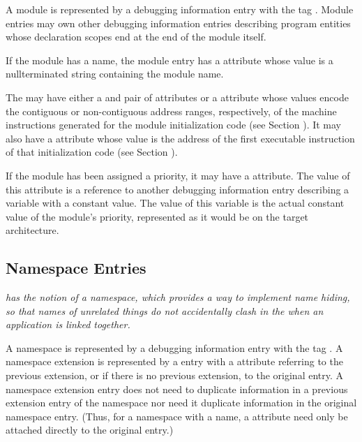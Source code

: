 A module is represented by a debugging information entry
with the 
tag \DWTAGmoduleTARG.  
Module entries may own other
debugging information entries describing program entities
whose declaration scopes end at the end of the module itself.

If the module has a name, the module entry has a 
\DWATname{} attribute 
whose value is a null\dash terminated string containing
the module name.

The  may have either a 
\DWATlowpc{} and
\DWAThighpc{} 
pair 
of 
attributes or a 
\DWATranges{} attribute
whose values encode the contiguous or non-contiguous address
ranges, respectively, of the machine instructions generated for
the module initialization
code\hypertarget{chap:DWATentrypcentryaddressofmoduleinitialization}{} 
(see Section ). 
It may also have a
\DWATentrypc{} attribute whose value is the address of
the first executable instruction of that initialization code
(see Section ).

If\hypertarget{chap:DWATprioritymodulepriority}{}
the module has been assigned a priority, it may have a
\DWATpriorityDEFN{} attribute. 
The value of this attribute is a
reference to another debugging information entry describing
a variable with a constant value. The value of this variable
is the actual constant value of the module\textquoteright s priority,
represented as it would be on the target architecture.

\subsection{Namespace Entries}
\label{chap:namespaceentries}
\textit{ has the notion of a namespace, which provides a way to
implement name hiding, so that names of unrelated things
do not accidentally clash in the 
 when an
application is linked together.}

A namespace is represented by a debugging information entry
with the tag \DWTAGnamespaceTARG. A namespace extension 
is\hypertarget{chap:DWATextensionpreviousnamespaceextensionororiginalnamespace}{}
represented by a \DWTAGnamespaceNAME{} entry with a 
\DWATextensionDEFN{}
attribute referring to the previous extension, or if there
is no previous extension, to the original 
\DWTAGnamespaceNAME{}
entry. A namespace extension entry does not need to duplicate
information in a previous extension entry of the namespace
nor need it duplicate information in the original namespace
entry. (Thus, for a namespace with a name, 
a \DWATname{} attribute 
need only be attached directly to the original
\DWTAGnamespaceNAME{} entry.)

